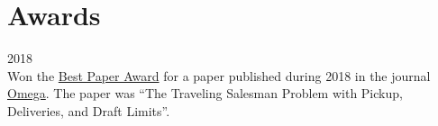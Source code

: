 \section*{Awards}

\begin{paracol}{2}
  \textsc{2018}
\switchcolumn
  \\
  Won the \href{https://santini.in/files/cv/omega-best-paper-18.pdf}{Best Paper Award} for a paper published during 2018 in the journal \href{https://www.journals.elsevier.com/omega}{Omega}.
  The paper was ``The Traveling Salesman Problem with Pickup, Deliveries, and Draft Limits''.
\end{paracol}